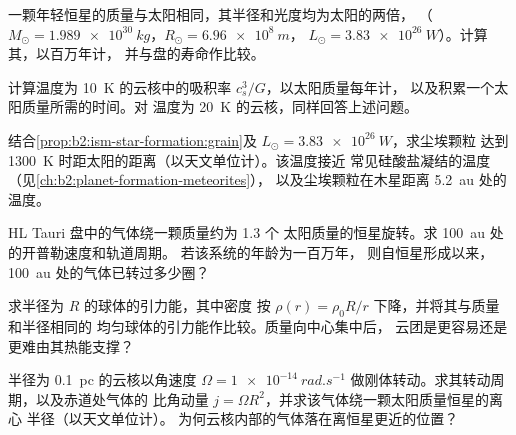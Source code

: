 \begin{exercise}[$\star\star$]\label{exo:b2:ism-star-formation:6}
一颗年轻恒星的质量与太阳相同，其半径和光度均为太阳的两倍，
（$M_\odot = \qty{1.989e30}{kg}$，$R_\odot = \qty{6.96e8}{m}$，
$L_\odot = \qty{3.83e26}{W}$）。计算其，以百万年计，
并与盘的寿命作比较。
\end{exercise}

\begin{exercise}[$\star\star$]\label{exo:b2:ism-star-formation:7}
计算温度为 \qty{10}{K} 的云核中的吸积率 $c_s^3/G$，以太阳质量每年计，
以及积累一个太阳质量所需的时间。对
温度为 \qty{20}{K} 的云核，同样回答上述问题。
\end{exercise}

\begin{exercise}[$\star\star$]\label{exo:b2:ism-star-formation:8}
结合\cref{prop:b2:ism-star-formation:grain}及 $L_\odot = \qty{3.83e26}{W}$，求尘埃颗粒
达到 \qty{1300}{K} 时距太阳的距离（以天文单位计）。该温度接近
常见硅酸盐凝结的温度（见\cref{ch:b2:planet-formation-meteorites}），
以及尘埃颗粒在木星距离
\qty{5.2}{au} 处的温度。
\end{exercise}

\begin{exercise}[$\star\star$]\label{exo:b2:ism-star-formation:9}
HL Tauri 盘中的气体绕一颗质量约为 \num{1.3} 个
太阳质量的恒星旋转。求 \qty{100}{au} 处的开普勒速度和轨道周期。
若该系统的年龄为一百万年，
则自恒星形成以来，\qty{100}{au} 处的气体已转过多少圈？
\end{exercise}

\begin{exercise}[$\star\star\star$]\label{exo:b2:ism-star-formation:10}
求半径为 $R$ 的球体的引力能，其中密度
按 $\rho(r) = \rho_0 R/r$ 下降，并将其与质量和半径相同的
均匀球体的引力能作比较。质量向中心集中后，
云团是更容易还是更难由其热能支撑？
\end{exercise}

\begin{exercise}[$\star\star\star$]\label{exo:b2:ism-star-formation:11}
半径为 \qty{0.1}{pc} 的云核以角速度
$\Omega = \qty{1e-14}{rad.s^{-1}}$ 做刚体转动。求其转动周期，以及赤道处气体的
比角动量 $j = \Omega R^2$，并求该气体绕一颗太阳质量恒星的离心
半径（以天文单位计）。
为何云核内部的气体落在离恒星更近的位置？
\end{exercise}

